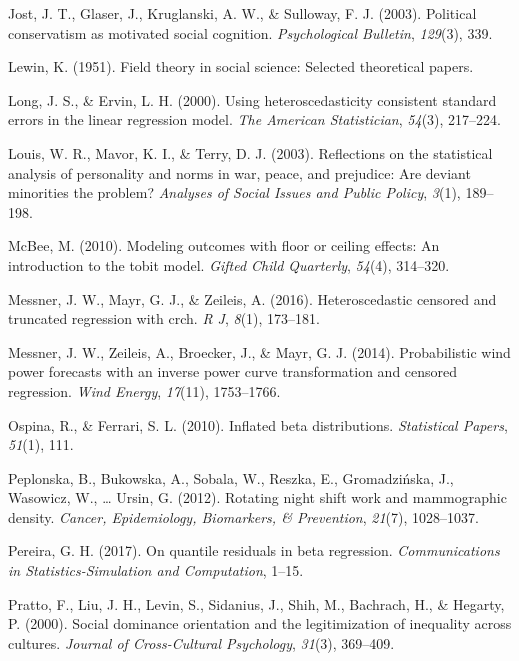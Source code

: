 \documentclass[english,man]{apa6}
\theoremstyle{definition}
\theoremstyle{definition}
\theoremstyle{remark}
\begin{document}
\hypertarget{ref-jost2003political}{}
Jost, J. T., Glaser, J., Kruglanski, A. W., \& Sulloway, F. J. (2003).
Political conservatism as motivated social cognition.
\emph{Psychological Bulletin}, \emph{129}(3), 339.

\hypertarget{ref-lewin1951field}{}
Lewin, K. (1951). Field theory in social science: Selected theoretical
papers.

\hypertarget{ref-long2000using}{}
Long, J. S., \& Ervin, L. H. (2000). Using heteroscedasticity consistent
standard errors in the linear regression model. \emph{The American
Statistician}, \emph{54}(3), 217--224.

\hypertarget{ref-louis2003reflections}{}
Louis, W. R., Mavor, K. I., \& Terry, D. J. (2003). Reflections on the
statistical analysis of personality and norms in war, peace, and
prejudice: Are deviant minorities the problem? \emph{Analyses of Social
Issues and Public Policy}, \emph{3}(1), 189--198.

\hypertarget{ref-mcbee2010modeling}{}
McBee, M. (2010). Modeling outcomes with floor or ceiling effects: An
introduction to the tobit model. \emph{Gifted Child Quarterly},
\emph{54}(4), 314--320.

\hypertarget{ref-messner2016heteroscedastic}{}
Messner, J. W., Mayr, G. J., \& Zeileis, A. (2016). Heteroscedastic
censored and truncated regression with crch. \emph{R J}, \emph{8}(1),
173--181.

\hypertarget{ref-messner2014probabilistic}{}
Messner, J. W., Zeileis, A., Broecker, J., \& Mayr, G. J. (2014).
Probabilistic wind power forecasts with an inverse power curve
transformation and censored regression. \emph{Wind Energy},
\emph{17}(11), 1753--1766.

\hypertarget{ref-ospina2010inflated}{}
Ospina, R., \& Ferrari, S. L. (2010). Inflated beta distributions.
\emph{Statistical Papers}, \emph{51}(1), 111.

\hypertarget{ref-peplonska2012rotating}{}
Peplonska, B., Bukowska, A., Sobala, W., Reszka, E., Gromadzińska, J.,
Wasowicz, W., \ldots{} Ursin, G. (2012). Rotating night shift work and
mammographic density. \emph{Cancer, Epidemiology, Biomarkers, \&
Prevention}, \emph{21}(7), 1028--1037.

\hypertarget{ref-pereira2017quantile}{}
Pereira, G. H. (2017). On quantile residuals in beta regression.
\emph{Communications in Statistics-Simulation and Computation}, 1--15.

\hypertarget{ref-pratto2000social}{}
Pratto, F., Liu, J. H., Levin, S., Sidanius, J., Shih, M., Bachrach, H.,
\& Hegarty, P. (2000). Social dominance orientation and the
legitimization of inequality across cultures. \emph{Journal of
Cross-Cultural Psychology}, \emph{31}(3), 369--409.
\end{document}
